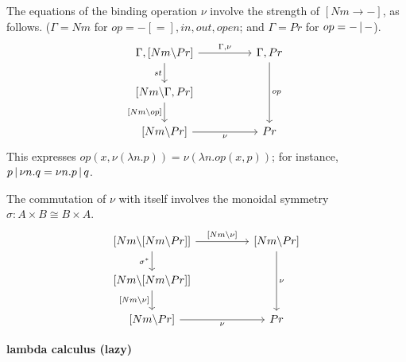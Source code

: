 \documentclass{article}
\begin{document}
The equations of the binding operation $\nu$ involve the strength of $[Nm\to -]$, as follows. ($\Gamma=Nm$ for $op=-[=],in,out,open$; and $\Gamma=Pr$ for $op=-\,|\, -$).
\[\begin{tikzcd}
	{\Gamma,[Nm\lam Pr]} && {\Gamma,Pr} \\
	{[Nm\lam \Gamma,Pr]} \\
	{[Nm\lam Pr]} && Pr
	\arrow["{\Gamma,\nu}", from=1-1, to=1-3]
	\arrow["st"', from=1-1, to=2-1]
	\arrow["op", from=1-3, to=3-3]
	\arrow["{[Nm\lam op]}"', from=2-1, to=3-1]
	\arrow["\nu"', from=3-1, to=3-3]
\end{tikzcd}\]
This expresses $op(x,\nu (\lambda n.p)) = \nu (\lambda n.op(x,p))$; for instance, $p\,|\, \nu n.q = \nu n. p\,|\, q$.

The commutation of $\nu$ with itself involves the monoidal symmetry $\sigma:A\times B\cong B\times A$.
\[\begin{tikzcd}
	{[Nm\lam [Nm\lam Pr]]} && {[Nm\lam Pr]} \\
	{[Nm\lam [Nm\lam Pr]]} \\
	{[Nm\lam Pr]} && Pr
	\arrow["{[Nm\lam \nu]}", from=1-1, to=1-3]
	\arrow["\sigma^\ast"', from=1-1, to=2-1]
	\arrow["\nu", from=1-3, to=3-3]
	\arrow["{[Nm\lam \nu]}"', from=2-1, to=3-1]
	\arrow["\nu"', from=3-1, to=3-3]
\end{tikzcd}\]

\newpage

\begin{mdframed}
    \begin{center}
        \textbf{lambda calculus (lazy)}
    \end{center}
\end{mdframed}
\end{document}
